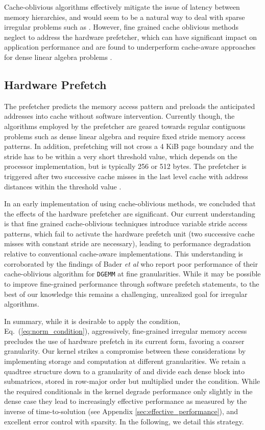 Cache-oblivious algorithms effectively mitigate the issue of latency between
memory hierarchies, and would seem to be a natural way to deal with sparse
irregular problems such as \SpAMM{}. However, fine grained cache oblivious
methods neglect to address the hardware prefetcher, which can have significant
impact on application performance \cite{Pan07algorithmsto, Dick2007} and are
found to underperform cache-aware approaches for dense linear algebra problems
\cite{yotov2007experimental, gunnels2007cache}.

\subsection{Hardware Prefetch}

The prefetcher predicts the memory access pattern and pre\-loads the
anticipated addresses into cache without software intervention. Currently
though, the algorithms employed by the prefetcher are geared towards regular
contiguous problems such as dense linear algebra and require fixed stride
memory access patterns. In addition, prefetching will not cross a 4 KiB page
boundary and the stride has to be within a very short threshold value, which
depends on the processor implementation, but is typically 256 or 512 bytes.
The prefetcher is triggered after two successive cache misses in the last
level cache with address distances within the threshold value
\cite[Sec.~2.4.4.4]{Intel2009}.

In an early implementation of \SpAMM{} using cache-oblivious methods, we
concluded that the effects of the hardware prefetcher are significant.  Our
current understanding is that fine grained cache-oblivious techniques introduce
variable stride access patterns, which fail to activate the hardware prefetch
unit (two successive cache misses with constant stride are necessary), leading
to performance degradation relative to conventional cache-aware
implementations. This understanding is corroborated by the findings of Bader
\emph{et al} \cite{bader08hardware-oriented} who report poor performance of
their cache-oblivious algorithm for {\tt DGEMM} at fine granularities. While it
may be possible to improve fine-grained performance through software prefetch
statements, to the best of our knowledge this remains a challenging, unrealized
goal for irregular algorithms.

In summary, while it is desirable to apply the \SpAMM{} condition,
Eq.~(\ref{eq:norm_condition}), aggressively, fine-grained irregular memory
access precludes the use of hardware prefetch in its current form, favoring a
coarser granularity. Our kernel strikes a compromise between these
considerations by implementing storage and computation at different
granularities. We retain a quadtree structure down to a granularity of  and divide each dense block into  submatrices, stored in
row-major order but multiplied under the \SpAMM{} condition. While the required
conditionals in the kernel degrade performance only slightly in the dense case
they lead to increasingly effective performance as measured by the inverse of
time-to-solution (see Appendix \ref{sec:effective_performance}), and excellent
error control with sparsity. In the following, we detail this strategy.

